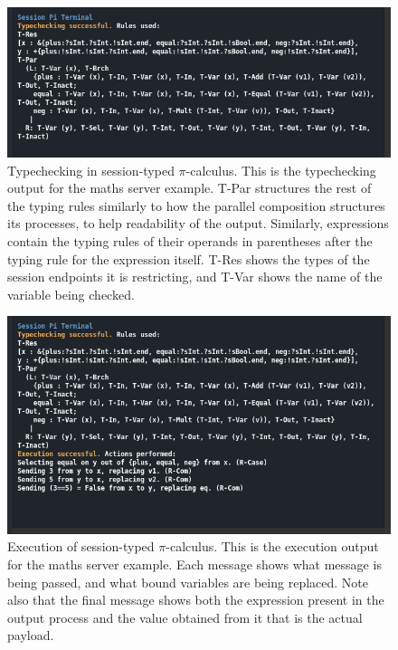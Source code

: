 \documentclass{l4proj}
\begin{document}
\begin{figure}[H]
\centering
\includegraphics[width=\textwidth]{images/InterfaceScreenshotSTCh.png}
\caption{Typechecking in session-typed $\pi$-calculus. This is the typechecking output for the maths server example. T-Par structures the rest of the typing rules similarly to how the parallel composition structures its processes, to help readability of the output. Similarly, expressions contain the typing rules of their operands in parentheses after the typing rule for the expression itself. T-Res shows the types of the session endpoints it is restricting, and T-Var shows the name of the variable being checked.}
\label{fig:scshSTCh}
\end{figure}
\begin{figure}[H]
\centering
\includegraphics[width=\textwidth]{images/InterfaceScreenshotSesExe.png}
\caption{Execution of session-typed $\pi$-calculus. This is the execution output for the maths server example. Each message shows what message is being passed, and what bound variables are being replaced. Note also that the final message shows both the expression present in the output process and the value obtained from it that is the actual payload.}
\label{fig:scshSSem}
\end{figure}
\end{document}
